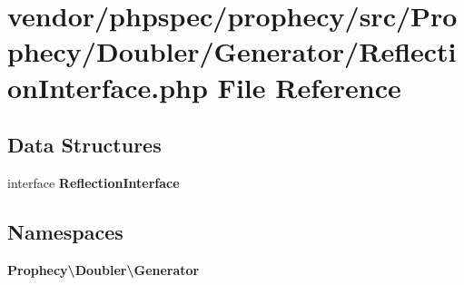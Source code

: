 \section{vendor/phpspec/prophecy/src/\+Prophecy/\+Doubler/\+Generator/\+Reflection\+Interface.php File Reference}
\label{_reflection_interface_8php}
\subsection*{Data Structures}
\begin{DoxyCompactItemize}
\item 
interface {\bf Reflection\+Interface}
\end{DoxyCompactItemize}
\subsection*{Namespaces}
\begin{DoxyCompactItemize}
\item 
 {\bf Prophecy\textbackslash{}\+Doubler\textbackslash{}\+Generator}
\end{DoxyCompactItemize}
